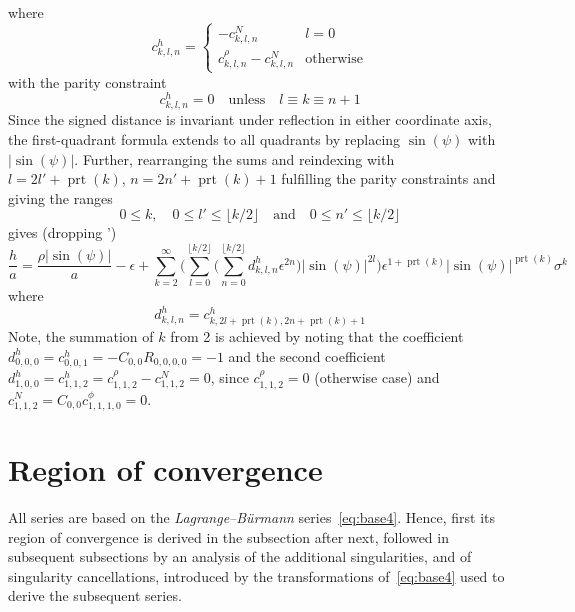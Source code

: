 \documentclass[a4paper]{amsart}
\DeclareMathOperator{\prt}{prt}
\begin{document}
where
\begin{equation*}
c^h_{k,l,n}=
\begin{cases}
-c^N_{k,l,n}&l=0\\
c^\rho_{k,l,n}-c^N_{k,l,n}&\text{otherwise}
\end{cases}
\end{equation*}
with the parity constraint
\begin{equation*}
c^h_{k,l,n}=0\quad\text{unless}\quad l\equiv k\equiv n+1
\end{equation*}
Since the signed distance is invariant under reflection in either coordinate axis, the first-quadrant formula extends to all quadrants by replacing $\sin(\psi)$ with $|\sin(\psi)|$.
Further, rearranging the sums and reindexing with $l=2l'+\prt(k)$, $n=2n'+\prt(k)+1$ fulfilling the parity constraints and giving the ranges
\begin{equation*}
0\leq k,\quad 0\leq l'\leq\lfloor k/2\rfloor\quad\text{and}\quad 0\leq n'\leq\lfloor k/2\rfloor
\end{equation*}
gives (dropping ')
\begin{equation*}
\frac{h}{a}
=
\frac{\rho|\sin(\psi)|}{a}-\epsilon+
\sum_{k=2}^{\infty}
\Bigg(
\sum_{l=0}^{\lfloor k/2\rfloor}
\Bigg(
\sum_{n=0}^{\lfloor k/2\rfloor}
d^{h}_{k,l,n}
\epsilon^{2n}
\Bigg)
|\sin(\psi)|^{2l}
\Bigg)
\epsilon^{1+\prt(k)}
|\sin(\psi)|^{\prt(k)}
\sigma^k
\end{equation*}
where
\begin{equation}\label{eq:d_h}
d^{h}_{k,l,n}=
c^h_{k,2l+\prt(k),2n+\prt(k)+1}
\end{equation}
Note, the summation of $k$ from 2 is achieved by noting that the coefficient $d^h_{0,0,0}=c^h_{0,0,1}=-C_{0,0}R_{0,0,0,0}=-1$ and the second coefficient $d^{h}_{1,0,0}=c^h_{1,1,2}=c^{\rho}_{1,1,2}-c^N_{1,1,2}=0$, since $c^\rho_{1,1,2}=0$ (otherwise case) and $c^N_{1,1,2}=C_{0,0}c^\phi_{1,1,1,0}=0$. %


\section{Region of convergence}\label{sec:region_of_convergence}
All series are based on the \emph{Lagrange–B\"urmann} series~\eqref{eq:base4}. Hence, first its region of convergence is derived in the subsection after next, followed in subsequent subsections by an analysis of the additional singularities, and of singularity cancellations, introduced by the transformations of~\eqref{eq:base4} used to derive the subsequent series.
\end{document}
